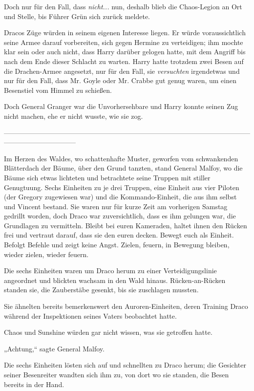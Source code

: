 {Doch nur für den Fall, dass \emph{nicht...} nun, deshalb blieb die Chaos-Legion an Ort und Stelle, bis Führer Grün sich zurück meldete.

Dracos Züge würden in seinem eigenen Interesse liegen. Er würde voraussichtlich seine Armee darauf vorbereiten, sich gegen Hermine zu verteidigen; ihm mochte klar sein oder auch nicht, dass Harry darüber gelogen hatte, mit dem Angriff bis nach dem Ende dieser Schlacht zu warten. Harry hatte trotzdem zwei Besen auf die Drachen-Armee angesetzt, nur für den Fall, sie \emph{versuchten} irgendetwas und nur für den Fall, dass Mr. Goyle oder Mr. Crabbe gut genug waren, um einen Besenstiel vom Himmel zu schießen.

Doch General Granger war die Unvorhersehbare und Harry konnte seinen Zug nicht machen, ehe er nicht wusste, wie sie zog.

--------------------------------------------------------------------------------------------------------------------------------------------

\hfill\break Im Herzen des Waldes, wo schattenhafte Muster, geworfen vom schwankenden Blätterdach der Bäume, über den Grund tanzten, stand General Malfoy, wo die Bäume sich etwas lichteten und betrachtete seine Truppen mit stiller Genugtuung. Sechs Einheiten zu je drei Truppen, eine Einheit aus vier Piloten (der Gregory zugewiesen war) und die Kommando-Einheit, die aus ihm selbst und Vincent bestand. Sie waren nur für kurze Zeit am vorherigen Samstag gedrillt worden, doch Draco war zuversichtlich, dass es ihm gelungen war, die Grundlagen zu vermitteln. Bleibt bei euren Kameraden, haltet ihnen den Rücken frei und vertraut darauf, dass sie den euren decken. Bewegt euch als Einheit. Befolgt Befehle und zeigt keine Angst. Zielen, feuern, in Bewegung bleiben, wieder zielen, wieder feuern.

Die sechs Einheiten waren um Draco herum zu einer Verteidigungslinie angeordnet und blickten wachsam in den Wald hinaus. Rücken-an-Rücken standen sie, die Zauberstäbe gesenkt, bis sie zuschlagen mussten.

Sie ähnelten bereits bemerkenswert den Auroren-Einheiten, deren Training Draco während der Inspektionen seines Vaters beobachtet hatte.

Chaos und Sunshine würden gar nicht wissen, was sie getroffen hatte.

„Achtung,“ sagte General Malfoy.

Die sechs Einheiten lösten sich auf und schnellten zu Draco herum; die Gesichter seiner Besenreiter wandten sich ihm zu, von dort wo sie standen, die Besen bereits in der Hand.

}

